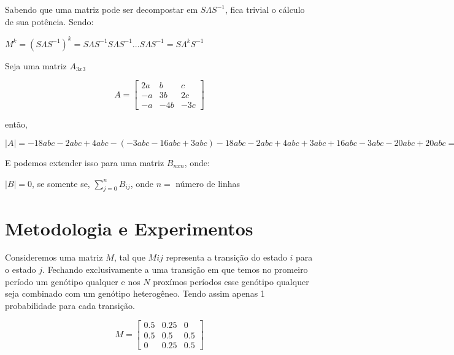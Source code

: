 \documentclass[14pt]{article}
\begin{document}
Sabendo que uma matriz pode ser decompostar em $S\Lambda S^{-1}$, fica trivial o cálculo de sua potência. Sendo:
\begin{center}
    $M^k = (S\Lambda S^{-1})^k = S\Lambda S^{-1} S\Lambda S^{-1} ... S\Lambda S^{-1} = S\Lambda^k S^{-1} $
\end{center}

$ $\\

Seja uma matriz $A_{3x3}$

\begin{displaymath}
A = \begin{bmatrix}
2a&b&c\\
-a&3b&2c\\
-a&-4b&-3c
\end{bmatrix}
\end{displaymath}

então, \\
\begin{center}
    $|A| = -18abc-2abc+4abc-(-3abc-16abc+3abc)-18abc-2abc+4abc+3abc+16abc-3abc-20abc+20abc = 0$    
\end{center}
$  $\\

E podemos extender isso para uma matriz $B_{nxn}$, onde:\\
\begin{center}
    $|B| = 0$, se somente se, $\sum_{j = 0}^{n} B_{ij}$, onde $n = $ número de linhas
\end{center}


\section{Metodologia e Experimentos}
\label{sec:metodologia}


Consideremos uma matriz $M$, tal que $Mij$ representa a transição do estado $i$ para o estado $j$. Fechando exclusivamente a uma transição em que temos no promeiro período um genótipo qualquer e nos $N$ proxímos períodos esse genótipo qualquer seja combinado com um genótipo heterogêneo. Tendo assim apenas 1 probabilidade para cada transição. 

\begin{displaymath}
M = \begin{bmatrix}
0.5&0.25&0\\
0.5&0.5&0.5\\
0&0.25&0.5
\end{bmatrix}
\end{displaymath}
\end{document}
